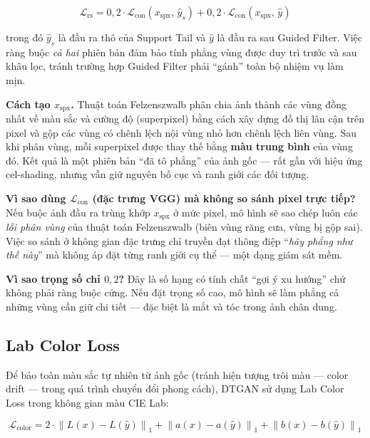 \begin{equation}
\label{eq:region_loss}
\mathcal{L}_{\text{rs}} = 0{,}2 \cdot \mathcal{L}_{\text{con}}(x_{\text{spx}},\, \widehat{y}_s) + 0{,}2 \cdot \mathcal{L}_{\text{con}}(x_{\text{spx}},\, \widehat{y})
\end{equation}

\noindent trong đó $\widehat{y}_s$ là đầu ra thô của Support Tail và $\widehat{y}$ là đầu ra sau Guided Filter. Việc ràng buộc \textit{cả hai} phiên bản đảm bảo tính phẳng vùng được duy trì trước và sau khâu lọc, tránh trường hợp Guided Filter phải ``gánh'' toàn bộ nhiệm vụ làm mịn.

\textbf{Cách tạo $x_{\text{spx}}$.} Thuật toán Felzenszwalb phân chia ảnh thành các vùng đồng nhất về màu sắc và cường độ (superpixel) bằng cách xây dựng đồ thị lân cận trên pixel và gộp các vùng có chênh lệch nội vùng nhỏ hơn chênh lệch liên vùng. Sau khi phân vùng, mỗi superpixel được thay thế bằng \textbf{màu trung bình} của vùng đó. Kết quả là một phiên bản ``đã tô phẳng'' của ảnh gốc --- rất gần với hiệu ứng cel-shading, nhưng vẫn giữ nguyên bố cục và ranh giới các đối tượng.

\textbf{Vì sao dùng $\mathcal{L}_{\text{con}}$ (đặc trưng VGG) mà không so sánh pixel trực tiếp?} Nếu buộc ảnh đầu ra trùng khớp $x_{\text{spx}}$ ở mức pixel, mô hình sẽ sao chép luôn các \textit{lỗi phân vùng} của thuật toán Felzenszwalb (biên vùng răng cưa, vùng bị gộp sai). Việc so sánh ở không gian đặc trưng chỉ truyền đạt thông điệp ``\textit{hãy phẳng như thế này}'' mà không áp đặt từng ranh giới cụ thể --- một dạng giám sát mềm.

\textbf{Vì sao trọng số chỉ $0{,}2$?} Đây là số hạng có tính chất ``gợi ý xu hướng'' chứ không phải ràng buộc cứng. Nếu đặt trọng số cao, mô hình sẽ làm phẳng cả những vùng cần giữ chi tiết --- đặc biệt là mắt và tóc trong ảnh chân dung.

\subsection{Lab Color Loss}
\label{subsec:color_loss}

Để bảo toàn màu sắc tự nhiên từ ảnh gốc (tránh hiện tượng trôi màu --- color drift --- trong quá trình chuyển đổi phong cách), DTGAN sử dụng Lab Color Loss trong không gian màu CIE Lab:

\begin{equation}
\label{eq:color_loss}
\mathcal{L}_{\text{color}} = 2 \cdot \left\| L(x) - L(\widehat{y}) \right\|_1 + \left\| a(x) - a(\widehat{y}) \right\|_1 + \left\| b(x) - b(\widehat{y}) \right\|_1
\end{equation}

